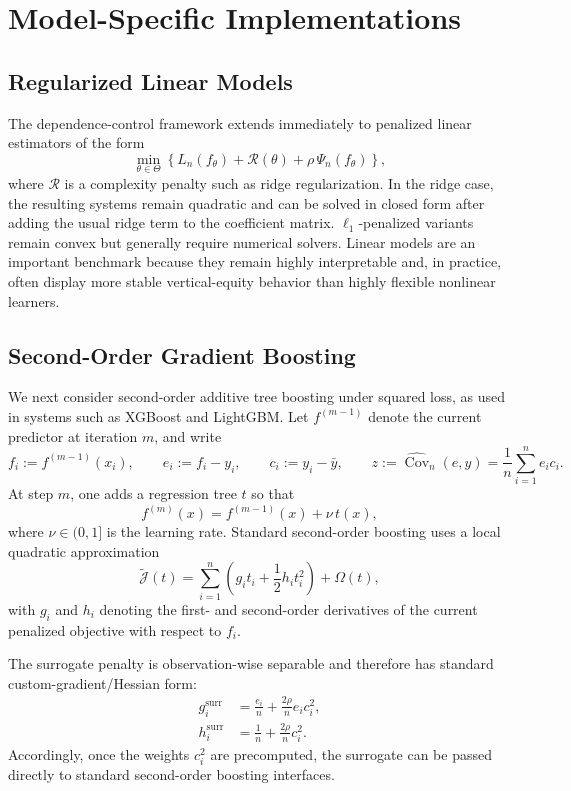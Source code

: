 \documentclass[12pt]{article}
\theoremstyle{plain}
\theoremstyle{definition}
\newcommand{\Cov}{\operatorname{Cov}}
\begin{document}
\section{Model-Specific Implementations}
\label{sec:implementation}

\subsection{Regularized Linear Models}

The dependence-control framework extends immediately to penalized linear estimators of the form
\[
\min_{\theta\in\Theta}
\left\{
L_n(f_\theta)+\mathcal R(\theta)+\rho\,\Psi_n(f_\theta)
\right\},
\]
where \(\mathcal R\) is a complexity penalty such as ridge regularization. In the ridge case, the resulting systems remain quadratic and can be solved in closed form after adding the usual ridge term to the coefficient matrix. \(\ell_1\)-penalized variants remain convex but generally require numerical solvers. Linear models are an important benchmark because they remain highly interpretable and, in practice, often display more stable vertical-equity behavior than highly flexible nonlinear learners.

\subsection{Second-Order Gradient Boosting}

We next consider second-order additive tree boosting under squared loss, as used in systems such as XGBoost and LightGBM. Let \(f^{(m-1)}\) denote the current predictor at iteration \(m\), and write
\[
f_i:=f^{(m-1)}(x_i),
\qquad
e_i:=f_i-y_i,
\qquad
c_i:=y_i-\bar y,
\qquad
z:=\widehat{\Cov}_n(e,y)=\frac{1}{n}\sum_{i=1}^n e_i c_i.
\]
At step \(m\), one adds a regression tree \(t\) so that
\[
f^{(m)}(x)=f^{(m-1)}(x)+\nu\,t(x),
\]
where \(\nu\in(0,1]\) is the learning rate. Standard second-order boosting uses a local quadratic approximation
\begin{equation}
\label{eq:boosting_local_objective}
\widetilde{\mathcal J}(t)
=
\sum_{i=1}^n
\left(
g_i t_i + \frac{1}{2}h_i t_i^2
\right)
+\Omega(t),
\end{equation}
with \(g_i\) and \(h_i\) denoting the first- and second-order derivatives of the current penalized objective with respect to \(f_i\).

The surrogate penalty is observation-wise separable and therefore has standard custom-gradient/Hessian form:
\begin{align}
g_i^{\mathrm{surr}}
&=
\frac{e_i}{n}+\frac{2\rho}{n}e_i c_i^2,
\label{eq:surr_grad}
\\
h_i^{\mathrm{surr}}
&=
\frac{1}{n}+\frac{2\rho}{n}c_i^2.
\label{eq:surr_hess}
\end{align}
Accordingly, once the weights \(c_i^2\) are precomputed, the surrogate can be passed directly to standard second-order boosting interfaces.
\end{document}
